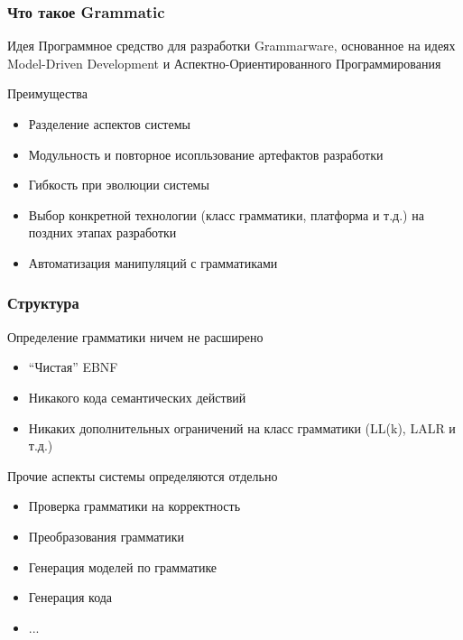 \documentclass[paper=screen,10pt,unicode]{beamer}
\begin{document}
\begin{frame}
	\frametitle{Что такое Grammatic}

	\begin{block}{Идея}
		Программное средство для разработки Grammarware, основанное на идеях Model-Driven Development
		и Аспектно-Ориентированного Программирования
	\end{block}
	\begin{block}{Преимущества}
		\begin{itemize}
			\item Разделение аспектов системы
			\item Модульность и повторное исопльзование артефактов разработки
			\item Гибкость при эволюции системы
			\item Выбор конкретной технологии (класс грамматики, платформа и т.д.) на поздних этапах разработки
			\item Автоматизация манипуляций с грамматиками
		\end{itemize}
	\end{block}
\end{frame}

\begin{frame}
	\frametitle{Структура}

	\begin{block}{Определение грамматики ничем не расширено}
		\begin{itemize}
			\item ``Чистая'' EBNF
			\item Никакого кода семантических действий
			\item Никаких дополнительных ограничений на класс грамматики (LL(k), LALR и т.д.)
		\end{itemize}
	\end{block}
	\begin{block}{Прочие аспекты системы определяются отдельно}
		\begin{itemize}
			\item Проверка грамматики на корректность
			\item Преобразования грамматики
			\item Генерация моделей по грамматике
			\item Генерация кода
			\item ...
		\end{itemize}
	\end{block}
\end{frame}
\end{document}
